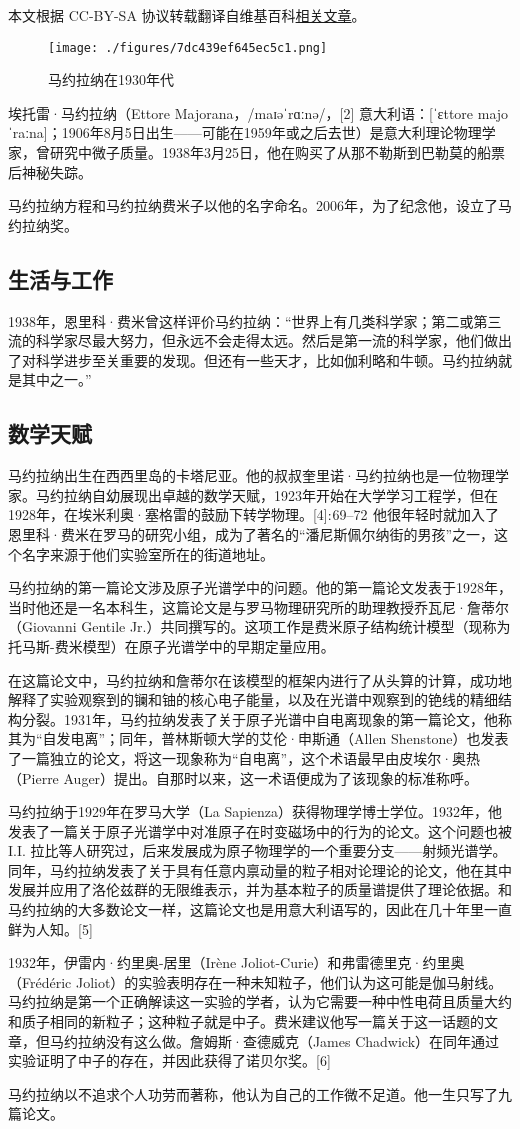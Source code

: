 
本文根据 CC-BY-SA 协议转载翻译自维基百科\href{https://en.wikipedia.org/wiki/Arthur_Compton}{相关文章}。

\begin{figure}[ht]
\centering
\texttt{[image: ./figures/7dc439ef645ec5c1.png]}
\caption{马约拉纳在1930年代} \label{fig_ATL_1}
\end{figure}
埃托雷·马约拉纳（Ettore Majorana，/maɪəˈrɑːnə/，[2] 意大利语：[ˈɛttore majoˈraːna]；1906年8月5日出生——可能在1959年或之后去世）是意大利理论物理学家，曾研究中微子质量。1938年3月25日，他在购买了从那不勒斯到巴勒莫的船票后神秘失踪。

马约拉纳方程和马约拉纳费米子以他的名字命名。2006年，为了纪念他，设立了马约拉纳奖。
\subsection{生活与工作}
1938年，恩里科·费米曾这样评价马约拉纳：“世界上有几类科学家；第二或第三流的科学家尽最大努力，但永远不会走得太远。然后是第一流的科学家，他们做出了对科学进步至关重要的发现。但还有一些天才，比如伽利略和牛顿。马约拉纳就是其中之一。”
\subsection{数学天赋} 
马约拉纳出生在西西里岛的卡塔尼亚。他的叔叔奎里诺·马约拉纳也是一位物理学家。马约拉纳自幼展现出卓越的数学天赋，1923年开始在大学学习工程学，但在1928年，在埃米利奥·塞格雷的鼓励下转学物理。[4]: 69–72  他很年轻时就加入了恩里科·费米在罗马的研究小组，成为了著名的“潘尼斯佩尔纳街的男孩”之一，这个名字来源于他们实验室所在的街道地址。



马约拉纳的第一篇论文涉及原子光谱学中的问题。他的第一篇论文发表于1928年，当时他还是一名本科生，这篇论文是与罗马物理研究所的助理教授乔瓦尼·詹蒂尔（Giovanni Gentile Jr.）共同撰写的。这项工作是费米原子结构统计模型（现称为托马斯-费米模型）在原子光谱学中的早期定量应用。

在这篇论文中，马约拉纳和詹蒂尔在该模型的框架内进行了从头算的计算，成功地解释了实验观察到的镧和铀的核心电子能量，以及在光谱中观察到的铯线的精细结构分裂。1931年，马约拉纳发表了关于原子光谱中自电离现象的第一篇论文，他称其为“自发电离”；同年，普林斯顿大学的艾伦·申斯通（Allen Shenstone）也发表了一篇独立的论文，将这一现象称为“自电离”，这个术语最早由皮埃尔·奥热（Pierre Auger）提出。自那时以来，这一术语便成为了该现象的标准称呼。

马约拉纳于1929年在罗马大学（La Sapienza）获得物理学博士学位。1932年，他发表了一篇关于原子光谱学中对准原子在时变磁场中的行为的论文。这个问题也被I.I. 拉比等人研究过，后来发展成为原子物理学的一个重要分支——射频光谱学。同年，马约拉纳发表了关于具有任意内禀动量的粒子相对论理论的论文，他在其中发展并应用了洛伦兹群的无限维表示，并为基本粒子的质量谱提供了理论依据。和马约拉纳的大多数论文一样，这篇论文也是用意大利语写的，因此在几十年里一直鲜为人知。[5]

1932年，伊雷内·约里奥-居里（Irène Joliot-Curie）和弗雷德里克·约里奥（Frédéric Joliot）的实验表明存在一种未知粒子，他们认为这可能是伽马射线。马约拉纳是第一个正确解读这一实验的学者，认为它需要一种中性电荷且质量大约和质子相同的新粒子；这种粒子就是中子。费米建议他写一篇关于这一话题的文章，但马约拉纳没有这么做。詹姆斯·查德威克（James Chadwick）在同年通过实验证明了中子的存在，并因此获得了诺贝尔奖。[6]

马约拉纳以不追求个人功劳而著称，他认为自己的工作微不足道。他一生只写了九篇论文。